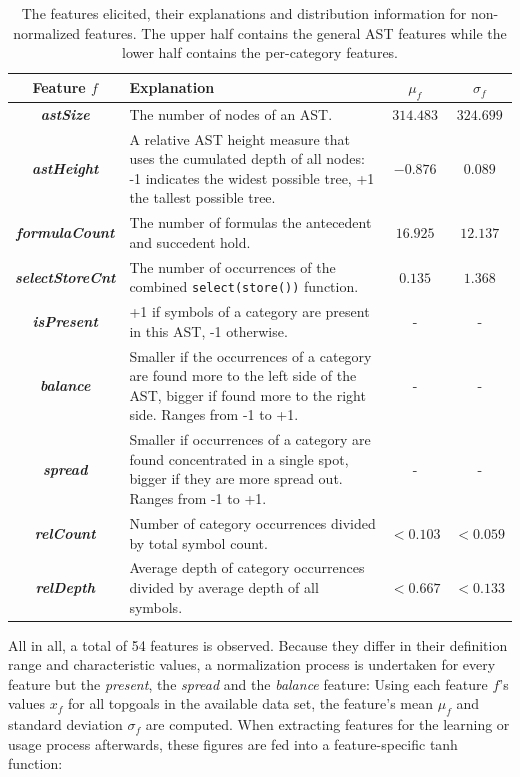 \documentclass[runningheads,a4paper]{llncs}
\begin{document}
\begin{table}[!htb]
	\begin{tabularx}{\textwidth}{ |c|X|c|c| } \hline
		Feature $f$ & Explanation & $\mu_f$ & $\sigma_f$ \\ \hline \hline
			
		\textbf{\textit{astSize}} 		
		& The number of nodes of an AST.
		& $314.483$ & $324.699$ \\ \hline
		\textbf{\textit{astHeight}}		
		& A relative AST height measure that uses the cumulated depth of all nodes: -1 indicates the widest possible tree, +1 the tallest possible tree.
		& $-0.876$ & $0.089$ \\ \hline
		\textbf{\textit{formulaCount}}	
		& The number of formulas the antecedent and succedent hold.
		& $16.925$ & $12.137$ \\ \hline
		\textbf{\textit{selectStoreCnt}}	
		& The number of occurrences of the combined \texttt{select(store())} function.
		& $0.135$ & $1.368$ \\ \hline \hline
			
		\textbf{\textit{isPresent}} 		
		& +1 if symbols of a category are present in this AST, -1 otherwise.
		& - & - \\ \hline
		\textbf{\textit{balance}} 		
		& Smaller if the occurrences of a category are found more to the left side of the AST, bigger if found more to the right side. Ranges from -1 to +1.
		& - & - \\ \hline
		\textbf{\textit{spread}} 		
		& Smaller if occurrences of a category are found concentrated in a single spot, bigger if they are more spread out. Ranges from -1 to +1.
		& - & - \\ \hline
		\textbf{\textit{relCount}} 		
		& Number of category occurrences divided by total symbol count.
		& $< 0.103$ & $< 0.059$ \\ \hline
		\textbf{\textit{relDepth}} 		
		& Average depth of category occurrences divided by average depth of all symbols.
		& $< 0.667$ & $< 0.133$ \\ \hline
	\end{tabularx}
\vspace*{2pt}
\caption{The features elicited, their explanations and distribution information for non-normalized features. The upper half contains the general AST features while the lower half contains the per-category features.}
\label{t:features}
\end{table}

All in all, a total of 54 features is observed. Because they differ in their definition range and characteristic values, a normalization process is undertaken for every feature but the \textit{present}, the \textit{spread} and the \textit{balance} feature: Using each feature $f$'s values $x_f$ for all topgoals in the available data set, the feature's mean $\mu_f$ and standard deviation $\sigma_f$ are computed. When extracting features for the learning or usage process afterwards, these figures are fed into a feature-specific tanh function: 
\end{document}
